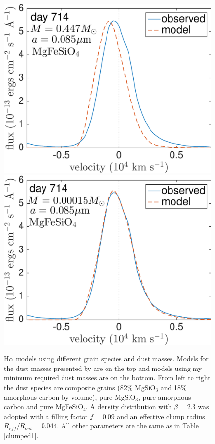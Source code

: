 \begin{figure}
\includegraphics[trim =0 0 0 0,clip=true,scale=0.34]{chapters/chapter5/images/silicates_take2/MgFeSiO4_Dwek_Ha.pdf}
\hspace{3mm}
\includegraphics[trim =0 0 0 -10,clip=true,scale=0.35]{chapters/chapter5/images/silicates_take2/MgFeSiO4_bestfit_Ha.pdf}
\caption{H$\alpha$ models using different grain species and dust masses.   
Models for the dust masses presented by \citet{Dwek2015} are on the top and models 
using my minimum required dust masses are on the bottom.  From left to 
right the dust species are composite grains (82\% MgSiO$_3$ and 18\% 
amorphous carbon by volume), pure MgSiO$_3$, pure amorphous carbon and pure 
MgFeSiO$_4$. A density distribution with $\beta=2.3$ was adopted with a 
filling factor $f=0.09$ and an effective clump radius 
$R_{eff}/R_{out}=0.044$.  All other parameters are the same as in Table 
\ref{clumped1}.}
\label{Dwek_models_Ha}
\end{figure}


